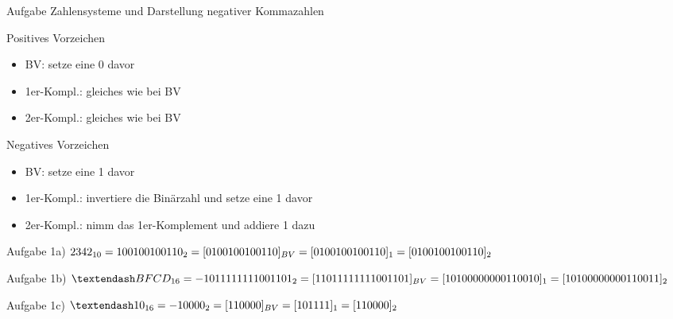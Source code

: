 \begin{frame}[allowframebreaks]{Aufgabe \thesection}{Zahlensysteme und Darstellung negativer Kommazahlen}
        \begin{block}{Positives Vorzeichen}
            \begin{itemize}
                \item BV: setze eine 0 davor
                \item 1er-Kompl.: gleiches wie bei BV
                \item 2er-Kompl.: gleiches wie bei BV
            \end{itemize}
        \end{block}
        \begin{block}{Negatives Vorzeichen}
            \begin{itemize}
                \item BV: setze eine 1 davor
                \item 1er-Kompl.: invertiere die Binärzahl und setze eine 1 davor
                \item 2er-Kompl.: nimm das 1er-Komplement und addiere 1 dazu
            \end{itemize}
        \end{block}
  \begin{solution}
    Aufgabe 1a)\newline\newline
    $2342_{10} = 100100100110_2 \newline\newline = [0100100100110]_{BV} \newline\newline = [0100100100110]_{1} \newline\newline = [0100100100110]_{2}$
  \end{solution}
  \begin{solution}
    Aufgabe 1b)\newline\newline
    $–BFCD_{16} = - 1011 1111 1100 1101_2 \newline\newline = [11011 1111 1100 1101]_{BV} \newline\newline = [1 0100 0000 0011 0010]_1 \newline\newline = [1 0100 0000 0011 0011]_2$
  \end{solution}
  \begin{solution}
    Aufgabe 1c)\newline\newline
    $–10_{16} = - 1 0000_2 \newline\newline = [11 0000]_{BV} \newline\newline = [10 1111]_1 \newline\newline = [11 0000]_2$  

\end{solution}
\end{frame}
